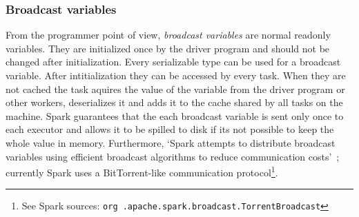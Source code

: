 

%


\subsubsection{Broadcast variables} \label{subsubsec:broadcast-variables}
From the programmer point of view, \textit{broadcast variables} are normal readonly variables.
They are initialized once by the driver program and should not be changed after initialization.
Every serializable type can be used for a broadcast variable.
After intitialization they can be accessed by every task.
When they are not cached the task aquires the value of the variable from the driver program or other workers, deserializes it and
adds it to the cache shared by all tasks on the machine.
Spark guarantees that the each broadcast variable is sent only once to each executor and allows it to be spilled to disk if its not
possible to keep the whole value in memory.
Furthermore, `Spark attempts to distribute broadcast variables using efficient broadcast algorithms to reduce communication
costs'~\cite{rdd-programming-guide}; currently Spark uses a BitTorrent-like communication protocol\footnote{See Spark sources: \texttt{org
.apache.spark.broadcast.TorrentBroadcast}}.


